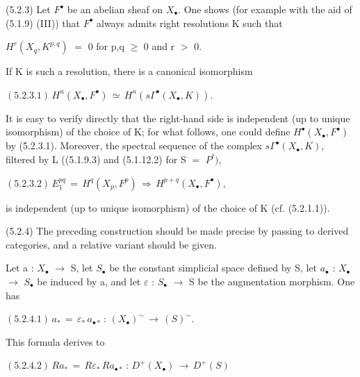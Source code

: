 \documentclass[11pt,twoside]{article}
\newcommand{\DFormula}[1]{%
  \par\smallskip\noindent\hspace*{0pt}\(\displaystyle #1\)\par\smallskip
}
\begin{document}
(5.2.3) Let \(F^{\bullet }\) be an abelian sheaf on \(X_{\bullet }\). One shows (for example with the aid of (5.1.9) (III)) that \(F^{\bullet }\) always admits right resolutions K such that\par
\par\medskip
\(H^{r}(X_{q},K^{p,q})\) \(=\) 0   for p,q \(\geq \) 0 and r \(>\) 0.\par
\par\medskip
If K is such a resolution, there is a canonical isomorphism\par
\par\medskip
\DFormula{(5.2.3.1)\,H^{n}(X_{\bullet },F^{\bullet })\,\simeq \,H^{n}(s\Gamma ^{\bullet }(X_{\bullet },K)).}
\par\medskip
It is easy to verify directly that the right-hand side is independent (up to unique isomorphism) of the choice of K; for what follows, one could define \(H^{\bullet }(X_{\bullet },F^{\bullet })\) by (5.2.3.1). Moreover, the spectral sequence of the complex \(s\Gamma ^{\bullet }(X_{\bullet },K)\), filtered by L ((5.1.9.3) and (5.1.12.2) for S \(=\) \(P^{t})\),\par
\par\medskip
\DFormula{(5.2.3.2)\,E_{1}^{pq}\,=\,H^{q}(X_{p},F^{p})\,\Rightarrow \,H^{p+q}(X_{\bullet },F^{\bullet }),}
\par\medskip
is independent (up to unique isomorphism) of the choice of K (cf. (5.2.1.1)).\par
\par\medskip
(5.2.4) The preceding construction should be made precise by passing to derived categories, and a relative variant should be given.\par
\par\medskip
Let a : \(X_{\bullet }\) \(\to \) S, let \(S_{\bullet }\) be the constant simplicial space defined by S, let \(a_{\bullet }\) : \(X_{\bullet }\) \(\to \) \(S_{\bullet }\) be induced by a, and let \(\varepsilon \) : \(S_{\bullet }\) \(\to \) S be the augmentation morphism. One has\par
\par\medskip
\DFormula{(5.2.4.1)\,a_{\ast }\,=\,\varepsilon _{\ast }\,a_{\bullet \ast }\,:\,(X_{\bullet })^{\sim }\,\to \,(S)^{\sim }.}
\par\medskip
This formula derives to\par
\par\medskip
\DFormula{(5.2.4.2)\,Ra_{\ast }\,=\,R\varepsilon _{\ast }\,Ra_{\bullet \ast }\,:\,D^{+}(X_{\bullet })\,\to \,D^{+}(S)}
\par\medskip
\end{document}

